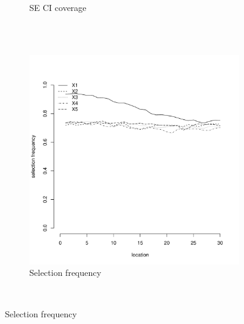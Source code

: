 \documentclass[authoryear, review, 11pt]{elsarticle}
\begin{document}
\begin{figure}
\begin{subfigure}[b]{0.45\textwidth}
		\caption{SE CI coverage}
	\end{subfigure}%
	\\%
	~ %
	\begin{subfigure}[b]{0.45\textwidth}
	\centering
		\includegraphics[width=\textwidth]{../../figures/simulation/15.30.profile_selection.pdf}
		\caption{Selection frequency}
	\end{subfigure}
	~ %

\end{figure}
\end{document}
